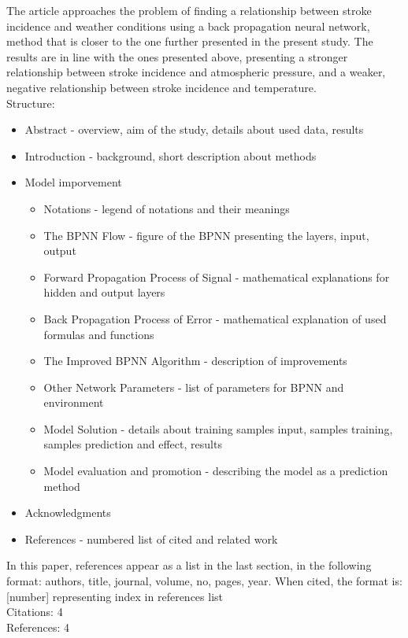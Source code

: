 \documentclass{article}
\begin{document}
\begin{itemize}
\normalsize The article \cite{Fang:2014dg} approaches the problem of finding a relationship between stroke incidence and weather conditions using a back propagation neural network, method that is closer to the one further presented in the present study. The results are in line with the ones presented above, presenting a stronger relationship between stroke incidence and atmospheric pressure, and a weaker, negative relationship between stroke incidence and temperature.\\


Structure:
\begin{itemize}
\item Abstract - overview, aim of the study, details about used data, results
\item Introduction - background, short description about methods
\item Model imporvement
\begin{itemize}
\item Notations - legend of notations and their meanings
\item The BPNN Flow - figure of the BPNN presenting the layers, input, output
\item Forward Propagation Process of Signal - mathematical explanations for hidden and output layers
\item Back Propagation Process of Error - mathematical explanation of used formulas and functions
\item The Improved BPNN Algorithm - description of improvements
\item Other Network Parameters - list of parameters for BPNN and environment
\item Model Solution - details about training samples input, samples training, samples prediction and effect, results
\item Model evaluation and promotion - describing the model as a prediction method
\end{itemize}
\item Acknowledgments
\item References - numbered list of cited and related work 
\end{itemize}
In this paper, references appear as a list in the last section, in the following format: authors, title, journal, volume, no, pages, year. When cited, the format is: [number] representing index in references list\\

Citations: 4\\
References: 4


\end{itemize}
\end{document}
